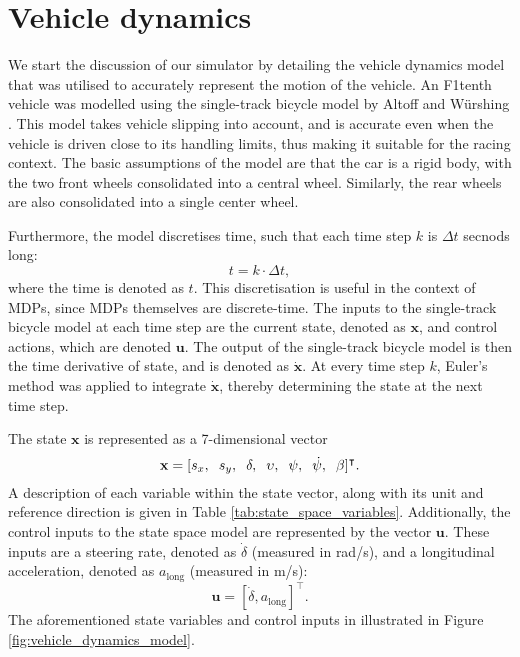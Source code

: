 \section{Vehicle dynamics}\label{sec:sim_vehicle_dynamics}

We start the discussion of our simulator by detailing the vehicle dynamics model that was utilised to accurately represent the motion of the vehicle.
An F1tenth vehicle was modelled using the single-track bicycle model by  Altoff and  W\"{u}rshing \cite{Althoff2020}.
This model takes vehicle slipping into account, and is accurate even when the vehicle is driven close to its handling limits, thus making it suitable for the racing context.
The basic assumptions of the model are that the car is a rigid body, with the two front wheels consolidated into a central wheel. 
Similarly, the rear wheels are also consolidated into a single center wheel. 


Furthermore, the model discretises time, such that each time step $k$ is $\Delta t$ secnods long:
\begin{equation}
    t = k \cdot \Delta t,
\end{equation}
where the time is denoted as $t$.
This discretisation is useful in the context of MDPs, since MDPs themselves are discrete-time.
The inputs to the single-track bicycle model at each time step are the current state, denoted as $\mathbf{x}$, and control actions, which are denoted $\mathbf{u}$.
The output of the single-track bicycle model is then the time derivative of state, and is denoted as $\mathbf{\dot{x}}$.
At every time step $k$, Euler's method was applied to integrate $\mathbf{\dot{x}}$, thereby determining the state at the next time step.


The state $\mathbf{x}$ is represented as a 7-dimensional vector
\begin{equation}
    \mathbf{x} = [s_x, \hspace{0.2cm} s_y, \hspace{0.2cm} \delta, \hspace{0.2cm} \upsilon, \hspace{0.2cm} \psi, \hspace{0.2cm} \dot{\psi}, \hspace{0.2cm} \beta]^\intercal .
\end{equation}
A description of each variable within the state vector, along with its unit and reference direction is given in Table \ref{tab:state_space_variables}.
Additionally, the control inputs to the state space model are represented by the vector $\mathbf{u}$. 
These inputs are a steering rate, denoted as $\dot{\delta}$ (measured in rad/s), and a longitudinal acceleration, denoted as $a_{\text{long}}$ (measured in m/s):
\begin{equation}
    \mathbf{u} = [\dot{\delta}, a_{\text{long}}]^\intercal.
\end{equation}
The aforementioned state variables and control inputs in illustrated in Figure \ref{fig:vehicle_dynamics_model}.

